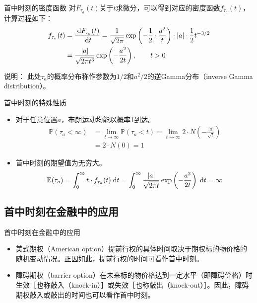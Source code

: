 \documentclass[t]{beamer}
\newcommand{\dif}{{\;\rm d}}
\renewcommand{\Pr}{\mathbb{P}}
\newcommand{\E}{\mathbb{E}}
\begin{document}
\begin{frame}{首中时刻的密度函数}
  对$F_{\tau_a}(t)$关于$t$求微分，可以得到对应的密度函数$f_{\tau_a}(t)$，计算过程如下：
  \begin{equation*}
  \begin{split}
  f_{\tau_a}(t)&=\frac{\dif F_{\tau_a}(t)}{\dif t}
  =\frac{1}{\sqrt{2\pi}}\exp\left(-\frac{1}{2}\cdot \frac{a^2}{t}\right)\cdot |a|\cdot \frac{1}{2}t^{-3/2}\\
  &=\frac{|a|}{\sqrt{2\pi t^3}}\exp\left(-\frac{a^2}{2t}\right), \qquad t>0 
  \end{split}
  \end{equation*}

  \begin{block}{说明：}
    此处$\tau_a$的概率分布称作参数为$1/2$和$a^2/2$的逆Gamma分布（inverse Gamma distribution）。
  \end{block}
\end{frame}



\begin{frame}{首中时刻的特殊性质}
  \begin{itemize}
    \item   对于任意位置$a$，布朗运动均能以概率1到达。
     \begin{equation*}
      \begin{split}
      \Pr(\tau_a<\infty)&=\lim_{t\to\infty}\Pr(\tau_a<t)=\lim_{t\to\infty}2\cdot N\left(-\frac{|a|}{\sqrt{t}}\right)\\
      &=2\cdot N(0)=1
      \end{split}
      \end{equation*}
    \item 首中时刻的期望值为无穷大。
    \begin{equation*}
      \E(\tau_a)=\int_{0}^{\infty} t\cdot f_{\tau_a}(t)\dif t=\int_{0}^{\infty} \frac{|a|}{\sqrt{2\pi t}}\exp\left(-\frac{a^2}{2t}\right)\dif t=\infty
      \end{equation*}
  \end{itemize}
\end{frame}

\subsection{首中时刻在金融中的应用}
\begin{frame}{首中时刻在金融中的应用}
    \begin{itemize}
      \item 美式期权（American option）提前行权的具体时间取决于期权标的物价格的随机变动情况。正因如此，提前行权的时间可看作首中时刻。
      \item 障碍期权（barrier option）在未来标的物价格达到一定水平（即障碍价格）时生效［也称敲入（knock-in）］或失效［也称敲出（knock-out）］。因此，障碍期权敲入或敲出的时间也可以看作首中时刻。
    \end{itemize}
\end{frame}
\end{document}
